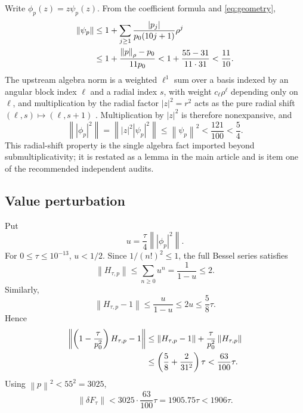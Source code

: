 \documentclass[11pt]{amsart}
\newcommand{\norm}[1]{\left\lVert #1\right\rVert}
\newcommand{\abs}[1]{\left\lvert #1\right\rvert}
\begin{document}
Write $\phi_p(z)=z\psi_p(z)$.  From the coefficient formula and
\eqref{eq:geometry},
\begin{align}
  \norm{\psi_p}
  &\le1+\sum_{j\ge1}
  \frac{\abs{p_j}}{p_0(10j+1)}\rho^j\notag\\
  &\le1+\frac{\norm p_\rho-p_0}{11p_0}
  <1+\frac{55-31}{11\cdot31}
  <\frac{11}{10}.
  \label{eq:psi}
\end{align}
The upstream algebra norm is a weighted $\ell^1$ sum over a basis indexed
by an angular block index $\ell$ and a radial index $s$, with weight
$c_\ell\rho^\ell$ depending only on $\ell$, and multiplication by the
radial factor $\abs z^2=r^2$ acts as the pure radial shift
$(\ell,s)\mapsto(\ell,s+1)$
\cite[Validation Specification, \S\S2 and~4]{ColbrookStepaniantsCert2026}.
Multiplication by $\abs z^2$ is therefore nonexpansive, and
\begin{equation}\label{eq:R}
  \norm{\abs{\phi_p}^2}
  =\norm{\abs z^2\abs{\psi_p}^2}
  \le\norm{\psi_p}^2
  <\frac{121}{100}<\frac54.
\end{equation}
This radial-shift property is the single algebra fact imported beyond
submultiplicativity; it is restated as a lemma in the main article and is
item one of the recommended independent audits.

\subsection{Value perturbation}

Put
\[
  u=\frac\tau4\norm{\abs{\phi_p}^2}.
\]
For $0\le\tau\le10^{-13}$, $u<1/2$.  Since
$1/(n!)^2\le1$, the full Bessel series satisfies
\begin{equation}\label{eq:Hnorm}
  \norm{H_{\tau,p}}
  \le\sum_{n\ge0}u^n
  =\frac1{1-u}\le2.
\end{equation}
Similarly,
\begin{equation}\label{eq:Hminus1}
  \norm{H_{\tau,p}-1}
  \le\frac{u}{1-u}
  \le2u
  \le\frac58\tau.
\end{equation}
Hence
\begin{align}
 \norm{\left(1-\frac\tau{p_0^2}\right)H_{\tau,p}-1}
 &\le\norm{H_{\tau,p}-1}
 +\frac\tau{p_0^2}\norm{H_{\tau,p}}\notag\\
 &\le\left(\frac58+\frac2{31^2}\right)\tau
 <\frac{63}{100}\tau.
 \label{eq:B}
\end{align}
Using $\norm p^2<55^2=3025$,
\begin{equation}\label{eq:value}
  \norm{\delta F_\tau}
  <3025\cdot\frac{63}{100}\tau
  =1905.75\tau
  <1906\tau.
\end{equation}
\end{document}
